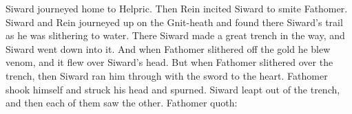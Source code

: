 \bpb Siward journeyed home to Helpric. Then Rein incited Siward to smite Fathomer. Siward and Rein journeyed up on the Gnit-heath and found there Siward’s trail as he was slithering to water. There Siward made a great trench in the way, and Siward went down into it. And when Fathomer slithered off the gold he blew venom, and it flew over Siward’s head. But when Fathomer slithered over the trench, then Siward ran him through with the sword to the heart. Fathomer shook himself and struck his head and spurned. Siward leapt out of the trench, and then each of them saw the other. Fathomer quoth:\epb\epg
